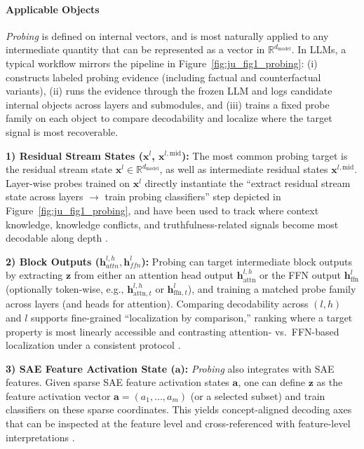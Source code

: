 \documentclass[11pt,letterpaper]{mystyle}
\begin{document}
\paragraph{Applicable Objects}
\textit{Probing} is defined on internal vectors, and is most naturally applied to any intermediate quantity that can be represented as a vector in $\mathbb{R}^{d_{\text{model}}}$.
In LLMs, a typical workflow mirrors the pipeline in Figure~\ref{fig:ju_fig1_probing}: (i) constructs labeled probing evidence (including factual and counterfactual variants), (ii) runs the evidence through the frozen LLM and logs candidate internal objects across layers and submodules, and (iii) trains a fixed probe family on each object to compare decodability and localize where the target signal is most recoverable.

\textbf{1) Residual Stream States ($\mathbf{x}^l$, $\mathbf{x}^{l,\text{mid}}$):}
The most common probing target is the residual stream state $\mathbf{x}^l \in \mathbb{R}^{d_{\text{model}}}$, as well as intermediate residual states  $\mathbf{x}^{l,\text{mid}}$.
Layer-wise probes trained on $\mathbf{x}^l$ directly instantiate the ``extract residual stream state across layers $\rightarrow$ train probing classifiers'' step depicted in Figure~\ref{fig:ju_fig1_probing}, and have been used to track where context knowledge, knowledge conflicts, and truthfulness-related signals become most decodable along depth \citep{juprobing_coling2024,arxiv2410_knowledgeconflict,zhang-etal-2024-truthx, orgad2025llms,you-etal-2025-probabilistic_emnlp2025}.

\textbf{2) Block Outputs ($\mathbf{h}_{attn}^{l,h}, \mathbf{h}_{ffn}^{l}$):}
Probing can target intermediate block outputs by extracting $\mathbf{z}$ from either an attention head output $\mathbf{h}_\text{attn}^{l,h}$ or the FFN output $\mathbf{h}_\text{ffn}^{l}$ (optionally token-wise, e.g., $\mathbf{h}_{\text{attn},t}^{l,h}$ or $\mathbf{h}_{\text{ffn},t}^{l}$), and training a matched probe family across layers (and heads for attention).
Comparing decodability across $(l,h)$ and $l$ supports fine-grained ``localization by comparison,'' ranking where a target property is most linearly accessible and contrasting attention- vs.\ FFN-based localization under a consistent protocol \citep{du2024tst,emnlp2025_headprobe,iclr2025_politicalprobe}.

\textbf{3) SAE Feature Activation State ($\mathbf{a}$):}
\textit{Probing} also integrates with SAE features.
Given sparse SAE feature activation states $\mathbf{a}$, one can define $\mathbf{z}$ as the feature activation vector $\mathbf{a}=(a_1,\dots,a_m)$ (or a selected subset) and train classifiers on these sparse coordinates.
This yields concept-aligned decoding axes that can be inspected at the feature level and cross-referenced with feature-level interpretations \citep{kantamneni2025_sparseprobing,absorption2024}.
\end{document}
